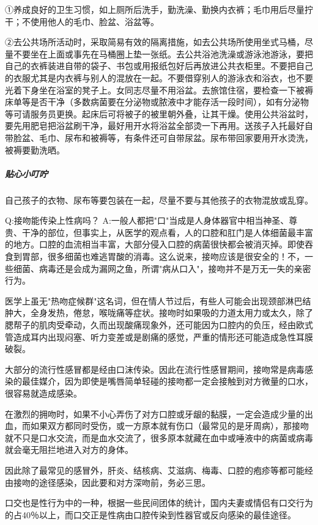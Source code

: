 \documentclass[12pt,UTF8]{ctexbook}
\begin{document}
①养成良好的卫生习惯，如上厕所后洗手，勤洗澡、勤换内衣裤；毛巾用后尽量拧干；不使用他人的毛巾、脸盆、浴盆等。

②去公共场所活动时，采取简易有效的隔离措施，如去公共场所使用坐式马桶，尽量不要坐在上面或事先在马桶圈上垫一张纸。去公共浴池洗澡或游泳池游泳，要把自己的衣裤装进自带的袋子、书包或用报纸包好后再放进公共衣柜里。不要把自己的衣服尤其是内衣裤与别人的混放在一起。不要借穿别人的游泳衣和浴衣，也不要光着下身坐在浴室的凳子上。女同志尽量不用浴盆。去旅馆住宿，要检查一下被褥床单等是否干净（多数病菌要在分泌物或脓液中才能存活一段时间），如有分泌物等可请服务员更换。起床后可将被子的被里朝外叠，让其干燥。使用公共浴盆时，要先用肥皂把浴盆刷干净，最好用开水将浴盆全部烫一下再用。送孩子入托最好自带脸盆、毛巾、尿布和被褥等，有条件还可自带尿盆。尿布带回家要用开水烫洗，被褥要勤洗晒。

\subparagraph{贴心小叮咛}

自己孩子的衣物、尿布等要包装在一起，尽量不要与其他孩子的衣物混放或乱穿。

Q:接吻能传染上性病吗？
A:一般人都把"口"当成是人身体器官中相当神圣、尊贵、干净的部位，但事实上，从医学的观点看，人的口腔和肛门是人体细菌最丰富的地方。口腔的血流相当丰富，大部分侵入口腔的病菌很快都会被消灭掉。即使吞食到胃部，很多细菌也难逃胃酸的消毒。这么说来，接吻应该是很安全的！不，一些细菌、病毒还是会成为漏网之鱼，所谓"病从口入"，接吻并不是万无一失的亲密行为。

医学上虽无"热吻症候群"这名词，但在情人节过后，有些人可能会出现颈部淋巴结肿大，全身发热，倦怠，喉咙痛等症状。接吻时如果吸的力道太用力或太久，除了腮帮子的肌肉受牵动，久而出现酸痛现象外，还可能因为口腔内的负压，经由欧式管造成耳内出现闷塞、听力变差或是剧痛的感觉，严重的情形还可能造成急性耳膜破裂。

大部分的流行性感冒都是经由口沫传染。因此在流行性感冒期间，接吻常是病毒感染的最佳媒介，因为即使是嘴唇简单轻碰的接吻都一定会接触到对方微量的口水，很容易就造成感染。

在激烈的拥吻时，如果不小心弄伤了对方口腔或牙龈的黏膜，一定会造成少量的出血，而如果双方都同时受伤，或一方原本就有伤口（最常见的是牙周病），那接吻就不只是口水交流，而是血水交流了，很多原本就藏在血中或唾液中的病菌或病毒就会毫无阻拦地进入对方的身体。

因此除了最常见的感冒外，肝炎、结核病、艾滋病、梅毒、口腔的疱疹等都可能经由接吻的途径感染，因此要和对方深吻前，务必三思。

口交也是性行为中的一种，根据一些民间团体的统计，国内夫妻或情侣有口交行为的占40％以上，而口交正是性病由口腔传染到性器官或反向感染的最佳途径。
\end{document}
